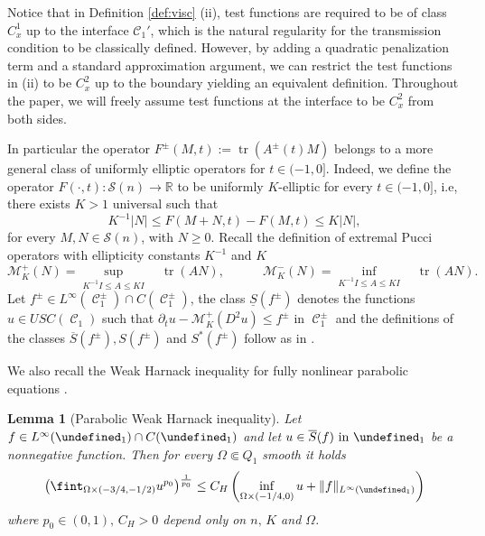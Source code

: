 \documentclass[12pt]{article}
\let\P\undefined
\numberwithin{Theorem}{section}
\newtheorem{Lemma}[Theorem]{Lemma}
\theoremstyle{definition}
\theoremstyle{remark}
\numberwithin{equation}{section}
\DeclareMathOperator{\C}{\mathcal{C}}
\DeclareMathOperator*{\tr}{tr}
\newcommand{\p}{\partial}
\newcommand{\P}{\mathcal{P}}
\begin{document}
Notice that in Definition \ref{def:visc} (ii), test functions are required to be of class $C_x^1$ up to the interface $\mathcal{C}_1'$, which is the natural regularity for the transmission condition to be classically defined. However, by adding a quadratic penalization term and a standard approximation argument, we can restrict the test functions in (ii) to be $C_x^2$ up to the boundary yielding an equivalent definition. Throughout the paper, we will freely assume test functions at the interface to be $C_x^2$ from both sides.
    
In particular the operator $F^\pm(M,t):=\tr(A^\pm(t)M)$ belongs to a more general class of uniformly elliptic operators for $t \in (-1,0]$.
Indeed, we define the operator $F(\cdot,t):\mathcal{S}(n)\to\mathbb{R}$ to be uniformly $K$-elliptic for every $t \in (-1,0]$, i.e, there exists $K>1$ universal such that 
\[
	K^{-1} |N|\leq F(M+N,t)-F(M,t) \leq K|N|,
\]
for every $M,N\in\mathcal{S}(n)$, with $N\geq 0$.
Recall the definition of extremal Pucci operators with ellipticity constants $K^{-1}$ and $K$  
\begin{equation*}\label{Pucci} \mathcal M_K^+ (N) = \sup_{K^{-1} I \le A \le K I} \quad \tr (A N), \quad \quad  \quad \mathcal M_K^- (N) = \inf_{K^{-1} I \le A \le K I} \quad \tr ( A N).\end{equation*} 
Let $f^\pm \in L^\infty(\C_{1}^\pm)\cap C(\C_{1}^\pm)$, 
the class $\underline{S}(f^\pm)$ denotes the functions $u \in USC(\C_1)$ such that $\p_t u - \mathcal M_K^+ (D^2 u) \leq f^\pm $ in $\C_1^{\pm}$ and the definitions of the classes $\overline{S}(f^\pm), S (f^\pm)$ and $S^{*}(f^\pm)$ follow as in \cite{CC}.


 We also recall the Weak Harnack inequality for fully nonlinear parabolic equations  \cite[Corollary 4.14]{wang1992regularityI}.
    \begin{Lemma}[Parabolic Weak Harnack inequality] \label{Lm:WeakHarnackIneq}
        Let $f \in L^{\infty}(\P_1) \cap C(\P_1)$ and let $u \in \overline{S}(f)\mbox{ in } \P_1$ be a nonnegative function. 
        Then for every $\Omega \Subset Q_1$ smooth it holds
        \[
        \left(\fint_{\Omega \times(-3/4, -1/2)} u^{p_0}\right)^\frac{1}{p_0}\leq C_H\left(\inf_{\Omega\times(-1/4, 0)} u + \|f\|_{L^\infty(\P_1)}\right)
        \]
        where $p_0 \in (0,1),\, C_H>0$ depend only on $n, \, K$ and $\Omega$.
    \end{Lemma}
\end{document}

